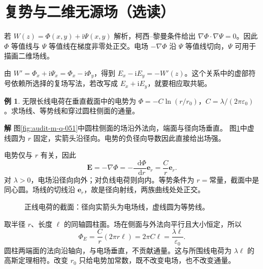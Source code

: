 \documentclass[11pt,openany,fontset=fandol]{ctexbook}
\theoremstyle{plain}\newtheorem{theorem}{定理}[chapter]\newtheorem{proposition}[theorem]{命题}
\theoremstyle{definition}\newtheorem{definition}{定义}[chapter]\newtheorem{example}{例}[chapter]
\theoremstyle{remark}\newtheorem*{remark}{说明}
\newcommand{\SolutionStart}{\par\nobreak\medskip\nobreak\noindent\textbf{解}\quad\ignorespaces}
\newenvironment{solution}{\SolutionStart}{\par\medskip}
\newcommand{\dd}{\mathop{}\!\mathrm d}\newcommand{\ii}{\mathrm i}\newcommand{\ee}{\mathrm e}
\newcommand{\vct}[1]{\bm{#1}}\newcommand{\Rea}{\operatorname{Re}}\newcommand{\Ima}{\operatorname{Im}}
\begin{document}
\section{复势与二维无源场（选读）}
若 $W(z)=\Phi(x,y)+\ii\Psi(x,y)$ 解析，柯西--黎曼条件给出 $\nabla\Phi\cdot\nabla\Psi=0$。因此 $\Phi$ 等值线与 $\Psi$ 等值线在梯度非零处正交。电场 $-\nabla\Phi$ 沿 $\Psi$ 等值线切向，$\Psi$ 可用于描画二维场线。

由 $W'=\Phi_x+\ii\Psi_x=\Phi_x-\ii\Phi_y$，得到 $E_x-\ii E_y=-W'(z)$。这个关系中的虚部符号依赖所选择的复场写法，若改写成 $E_x+\ii E_y$，就要相应取共轭。

\begin{example}
无限长线电荷在垂直截面中的电势为 $\Phi=-C\ln(r/r_0)$，$C=\lambda/(2\pi\varepsilon_0)$。求场线、等势线和穿过圆柱侧面的通量。
\end{example}

\begin{solution}
图\ref{fig:audit-m-q-051}中圆柱侧面的场沿外法向，端面与径向场垂直。
图\ref{fig:orig-042}中虚线圆为 $r$ 固定，实箭头沿径向。电势的负径向导数因此直接给出场强。

电势仅与 $r$ 有关，因此
\[
\vct E=-\nabla\Phi=-\frac{\dd\Phi}{\dd r}\vct e_r
=\frac Cr\vct e_r.
\]
对 $\lambda>0$，电场沿径向向外；对负线电荷则向内。等势条件为 $r=\text{常量}$，截面中是同心圆。场线的切线沿 $\vct e_r$，故是径向射线，两族曲线处处正交。

\begin{figure}[H]\centering
{}
\caption{正线电荷的截面：径向实箭头为电场线，虚线圆为等势线。}
\label{fig:orig-042}
\end{figure}

取半径 $r$、长度 $\ell$ 的同轴圆柱面。场在侧面与外法向平行且大小恒定，所以
\[
\Phi_E=\frac Cr(2\pi r\ell)=2\pi C\ell
=\frac{\lambda\ell}{\varepsilon_0}.
\]
圆柱两端面的法向沿轴向，与电场垂直，不贡献通量。这与所围线电荷为 $\lambda\ell$ 的高斯定理相符。改变 $r_0$ 只给电势加常数，既不改变电场，也不改变通量。

\end{solution}

\clearpage
\end{document}

